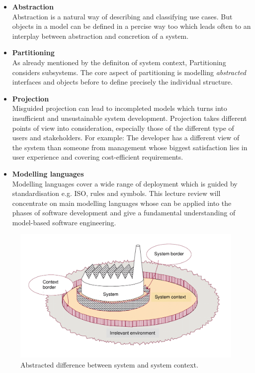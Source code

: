 \begin{itemize}
	\item \textbf{Abstraction} 
	\\ 
	Abstraction is a natural way of describing and classifying use cases. But objects in a model can be defined in a percise way too which leads often to an interplay between abstraction and concretion of a system.
	\item \textbf{Partitioning} 
	\\
	As already mentioned by the definiton of system context, Partitioning considers subsystems. The core aspect of partitioning is modelling \textit{abstracted} interfaces and objects before to define precisely the individual structure.
	\item \textbf{Projection} 
	\\
	Misguided projection can lead to incompleted models which turns into insufficient and unsustainable system development. Projection takes different points of view into consideration, especially those of the different type of users and stakeholders. For example: The developer has a different view of the system than someone from management whose biggest satisfaction lies in user experience and covering cost-efficient requirements.
	\item \textbf{Modelling languages} 
	\\
	Modelling languages cover a wide range of deployment which is guided by standardisation e.g. ISO, rules and symbols. This lecture review will concentrate on main modelling languages whose can be applied into the phases of software development and give a fundamental understanding of model-based software engineering.
\end{itemize}


\begin{figure}[!hb]
	\centering
	\includegraphics[scale=0.6]{SystemAndContext}
	\caption{Abstracted difference between system and system context. \cite{AmelieLang.2019}}
\end{figure}


